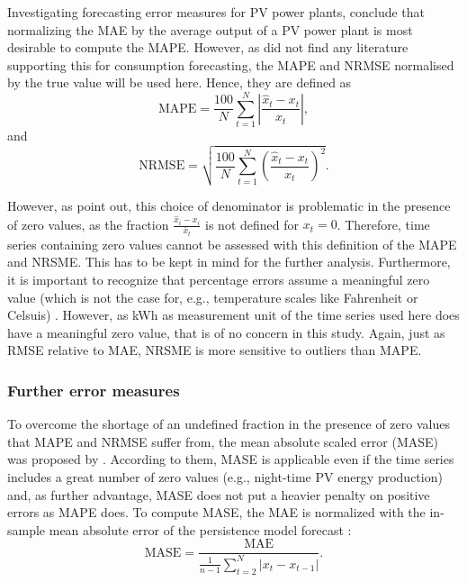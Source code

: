 Investigating forecasting error measures for PV power plants, \citet{Hoff:2013} conclude that normalizing the MAE by the average output of a PV power plant is most desirable to compute the MAPE. However, as \citet{Meer:2018} did not find any literature supporting this for consumption forecasting, the MAPE and NRMSE normalised by the true value will be used here. Hence, they are defined as
%
\begin{equation} \label{Eq:MAPE}
\text{MAPE}=\frac{100}{N}\sum_{t=1}^N\left|\frac{\widehat{x}_t-x_t}{x_t}\right|,
\end{equation}
and
\begin{equation} \label{Eq:NRMSE}
\text{NRMSE}=\sqrt{\frac{100}{N}\sum_{t=1}^N\left(\frac{\widehat{x}_t-x_t}{x_t}\right)^2}.
\end{equation}

\noindent However, as \citet{Hyndman:2006} point out, this choice of denominator is problematic in the presence of zero values, as the fraction $\frac{\widehat{x}_i-x_i}{\bar{x}_t}$ is not defined for $x_t=0$. Therefore, time series containing zero values cannot be assessed with this definition of the MAPE and NRSME. This has to be kept in mind for the further analysis. Furthermore, it is important to recognize that percentage errors assume a meaningful zero value (which is not the case for, e.g., temperature scales like Fahrenheit or Celsuis) \citep{Hyndman:2006}. However, as kWh as measurement unit of the time series used here does have a meaningful zero value, that is of no concern in this study. Again, just as RMSE relative to MAE, NRSME is more sensitive to outliers than MAPE.


\subsubsection{Further error measures}

To overcome the shortage of an undefined fraction in the presence of zero values that MAPE and NRMSE suffer from, the mean absolute scaled error (MASE) was proposed by \citet{Hyndman:2006}. According to them, MASE is applicable even if the time series includes a great number of zero values (e.g., night-time PV energy production) and, as further advantage, MASE does not put a heavier penalty on positive errors as MAPE does. To compute MASE, the MAE is normalized with the in-sample mean absolute error of the persistence model forecast \citet{Hyndman:2006}:
%
\begin{equation} \label{Eq:MASE}
\text{MASE}=\frac{\text{MAE}}{\frac{1}{n-1}\sum_{t=2}^N\left|x_t-x_{t-1}\right|}.
\end{equation}

